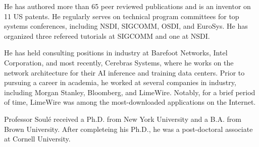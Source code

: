 \documentclass[11pt]{article}
\begin{document}

He has authored more than 65 peer reviewed publications and is
an inventor on 11 US patents.
He regularly serves on technical program committees for top systems
conferences, including NSDI, SIGCOMM, OSDI, and EuroSys. He has
organized three refereed tutorials at SIGCOMM and one at NSDI.


He has held consulting positions in industry at Barefoot Networks,
Intel Corporation, and most recently, Cerebras Systems, where he works
on the network architecture for their AI inference and training data
centers.  Prior to pursuing a career in academia, he worked at several
companies in industry, including Morgan Stanley, Bloomberg, and
LimeWire. Notably, for a brief period of time, LimeWire was among the
most-downloaded applications on the Internet.


Professor Soul\'{e} received a Ph.D. from New York University and a
B.A. from Brown University. After completeing his Ph.D., he was a
post-doctoral associate at Cornell University.
\end{document}
